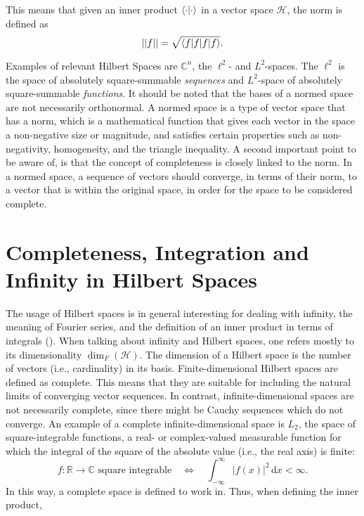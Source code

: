 This means that given an inner product $\braket{\cdot}$ in a vector space $\mathcal{H}$, the norm is defined as 
\begin{equation}
    ||f|| = \sqrt{\braket{f|f}}. 
\end{equation}


Examples of relevant Hilbert Spaces are $\mathbb{C}^n$, the $\ell^2$- and $L^2$-spaces. The $\ell^2$ is the space of absolutely square-summable \textit{sequences} and $L^2$-space of absolutely square-summable \textit{functions}. It should be noted that the bases of a normed space are not necessarily orthonormal. A normed space is a type of vector space that has a norm, which is a mathematical function that gives each vector in the space a non-negative size or magnitude, and satisfies certain properties such as non-negativity, homogeneity, and the triangle inequality.
A second important point to be aware of, is that the concept of completeness is closely linked to the norm. In a normed space, a sequence of vectors should converge, in terms of their norm, to a vector that is within the original space, in order for the space to be considered complete. 




\section{Completeness, Integration and Infinity in Hilbert Spaces}
The usage of Hilbert spaces is in general interesting for dealing with infinity, the meaning of Fourier series, and the definition of an inner product in terms of integrals (\cite{kennedy_hilbert_2013}). 
When talking about infinity and Hilbert spaces, one refers mostly to its dimensionality ${\dim_{F}(\mathcal{H})}$. The dimension of a Hilbert space is the number of vectors (i.e., cardinality) in its basis. Finite-dimensional Hilbert spaces are defined as complete. This means that they are suitable for including the natural limits of converging vector sequences. In contrast, infinite-dimensional spaces are not necessarily complete, since there might be Cauchy sequences which do not converge. An example of a complete infinite-dimensional space is $L_2$, the space of square-integrable functions, a real- or complex-valued measurable function for which the integral of the square of the absolute value (i.e., the real axis) is finite:
\begin{equation}
    f:\mathbb {R} \to \mathbb {C} {\text{ square integrable}}\quad \iff \quad \int _{-\infty }^{\infty }|f(x)|^{2}\,\mathrm {d} x<\infty .
\end{equation}
In this way, a complete space is defined to work in. 
Thus, when defining the inner product,

